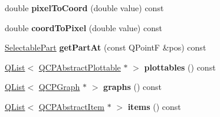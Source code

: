 \begin{DoxyCompactItemize}
\item 
double {\bfseries pixel\+To\+Coord} (double value) const \hypertarget{class_q_c_p_axis_ae9289ef7043b9d966af88eaa95b037d1}{}\label{class_q_c_p_axis_ae9289ef7043b9d966af88eaa95b037d1}

\item 
double {\bfseries coord\+To\+Pixel} (double value) const \hypertarget{class_q_c_p_axis_a985ae693b842fb0422b4390fe36d299a}{}\label{class_q_c_p_axis_a985ae693b842fb0422b4390fe36d299a}

\item 
\hyperlink{class_q_c_p_axis_abee4c7a54c468b1385dfce2c898b115f}{Selectable\+Part} {\bfseries get\+Part\+At} (const Q\+PointF \&pos) const \hypertarget{class_q_c_p_axis_a5ec3e1aa9fb107b7973e5c47bead7ecf}{}\label{class_q_c_p_axis_a5ec3e1aa9fb107b7973e5c47bead7ecf}

\item 
\hyperlink{class_q_list}{Q\+List}$<$ \hyperlink{class_q_c_p_abstract_plottable}{Q\+C\+P\+Abstract\+Plottable} $\ast$ $>$ {\bfseries plottables} () const \hypertarget{class_q_c_p_axis_adb1c6fdd21e5e372b10c0d02111d1c41}{}\label{class_q_c_p_axis_adb1c6fdd21e5e372b10c0d02111d1c41}

\item 
\hyperlink{class_q_list}{Q\+List}$<$ \hyperlink{class_q_c_p_graph}{Q\+C\+P\+Graph} $\ast$ $>$ {\bfseries graphs} () const \hypertarget{class_q_c_p_axis_aa06c2880e628fc3ea96aa77bb02a7e69}{}\label{class_q_c_p_axis_aa06c2880e628fc3ea96aa77bb02a7e69}

\item 
\hyperlink{class_q_list}{Q\+List}$<$ \hyperlink{class_q_c_p_abstract_item}{Q\+C\+P\+Abstract\+Item} $\ast$ $>$ {\bfseries items} () const \hypertarget{class_q_c_p_axis_a506d1efa23600e8a30ca92ef7002d122}{}\label{class_q_c_p_axis_a506d1efa23600e8a30ca92ef7002d122}

\end{DoxyCompactItemize}

